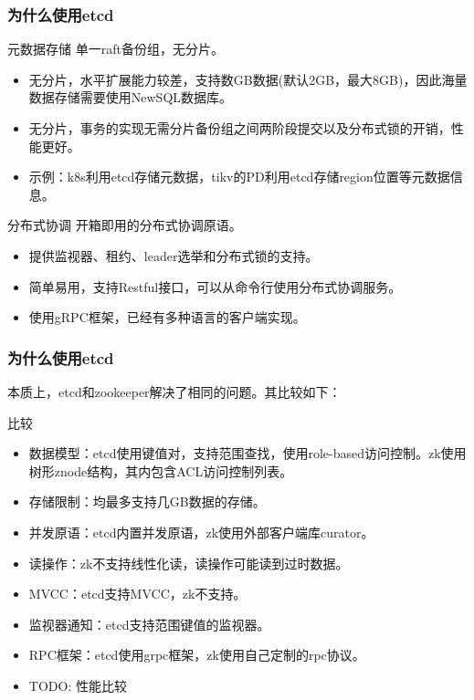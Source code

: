 \documentclass{beamer}
\begin{document}
%
%
\begin{frame}
\frametitle{为什么使用etcd}

\begin{exampleblock}{元数据存储}
单一raft备份组，无分片。
\begin{itemize}
    \item 无分片，水平扩展能力较差，支持数GB数据(默认2GB，最大8GB)，因此海量数据存储需要使用NewSQL数据库。
    \item 无分片，事务的实现无需分片备份组之间两阶段提交以及分布式锁的开销，性能更好。
    \item 示例：k8s利用etcd存储元数据，tikv的PD利用etcd存储region位置等元数据信息。
\end{itemize}
\end{exampleblock}

\begin{exampleblock}{分布式协调}
开箱即用的分布式协调原语。
\begin{itemize}
    \item 提供监视器、租约、leader选举和分布式锁的支持。
    \item 简单易用，支持Restful接口，可以从命令行使用分布式协调服务。
    \item 使用gRPC框架，已经有多种语言的客户端实现。
\end{itemize}
\end{exampleblock}

\end{frame}

%
%
\begin{frame}
\frametitle{为什么使用etcd}

本质上，etcd和zookeeper解决了相同的问题。其比较如下：

\begin{alertblock}{比较}
    \begin{itemize}
        \item 数据模型：etcd使用键值对，支持范围查找，使用role-based访问控制。zk使用树形znode结构，其内包含ACL访问控制列表。
        \item 存储限制：均最多支持几GB数据的存储。
        \item 并发原语：etcd内置并发原语，zk使用外部客户端库curator。
        \item 读操作：zk不支持线性化读，读操作可能读到过时数据。
        \item MVCC：etcd支持MVCC，zk不支持。
        \item 监视器通知：etcd支持范围键值的监视器。
        \item RPC框架：etcd使用grpc框架，zk使用自己定制的rpc协议。
        \item TODO: 性能比较
    \end{itemize}
\end{alertblock}

\end{frame}
\end{document}
